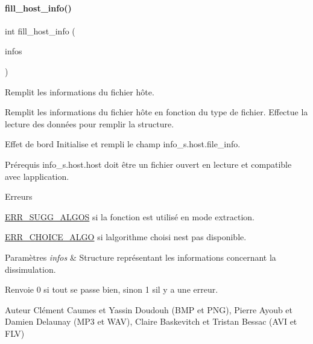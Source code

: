 \paragraph{\texorpdfstring{fill\+\_\+host\+\_\+info()}{fill\_host\_info()}}
{\footnotesize\ttfamily int fill\+\_\+host\+\_\+info (\begin{DoxyParamCaption}\item[{\hyperlink{a00008_aa8ca908d92fb5bdd3c0a9e1f58b2cf03}{info\+\_\+s} $\ast$}]{infos }\end{DoxyParamCaption})}



Remplit les informations du fichier hôte. 

Remplit les informations du fichier hôte en fonction du type de fichier. Effectue la lecture des données pour remplir la structure. \begin{DoxyParagraph}{Effet de bord}
Initialise et rempli le champ info\+\_\+s.\+host.\+file\+\_\+info. 
\end{DoxyParagraph}
\begin{DoxyParagraph}{Prérequis}
info\+\_\+s.\+host.\+host doit être un fichier ouvert en lecture et compatible avec l\textquotesingle{}application. 
\end{DoxyParagraph}
\begin{DoxyRefDesc}{Erreurs}
\item[\hyperlink{a00134__errors000010}{Erreurs}]\hyperlink{a00011_a08b18ac8af0f3462354240d9732f3852a72cfc98feeed9df5050bd2b25d2d28c2}{E\+R\+R\+\_\+\+S\+U\+G\+G\+\_\+\+A\+L\+G\+OS} si la fonction est utilisé en mode extraction. 

\hyperlink{a00011_a08b18ac8af0f3462354240d9732f3852ab79036268630b509f43f01d2082a9154}{E\+R\+R\+\_\+\+C\+H\+O\+I\+C\+E\+\_\+\+A\+L\+GO} si l\textquotesingle{}algorithme choisi n\textquotesingle{}est pas disponible. \end{DoxyRefDesc}

\begin{DoxyParams}{Paramètres}
{\em infos} & Structure représentant les informations concernant la dissimulation. \\
\hline
\end{DoxyParams}
\begin{DoxyReturn}{Renvoie}
0 si tout se passe bien, sinon 1 s\textquotesingle{}il y a une erreur. 
\end{DoxyReturn}
\begin{DoxyAuthor}{Auteur}
Clément Caumes et Yassin Doudouh (B\+MP et P\+NG), Pierre Ayoub et Damien Delaunay (M\+P3 et W\+AV), Claire Baskevitch et Tristan Bessac (A\+VI et F\+LV) 
\end{DoxyAuthor}


